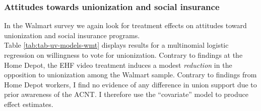 \documentclass[
  11pt,
  oneside]{article}
\begin{document}
\subsubsection{Attitudes towards unionization and social insurance}\label{attitudes-towards-unionization-and-social-insurance}

In the Walmart survey we again look for treatment effects on attitudes toward unionization and social insurance programs.\\
Table \ref{tab:tab-uv-models-wmt} displays results for a multinomial logistic regression on willingness to vote for unionization. Contrary to findings at the Home Depot, the EHF video treatment induces a modest \emph{reduction} in the opposition to unionization among the Walmart sample. Contrary to findings from Home Depot workers, I find no evidence of any difference in union support due to prior awareness of the ACNT. I therefore use the ``covariate'' model to produce effect estimates.
\end{document}
